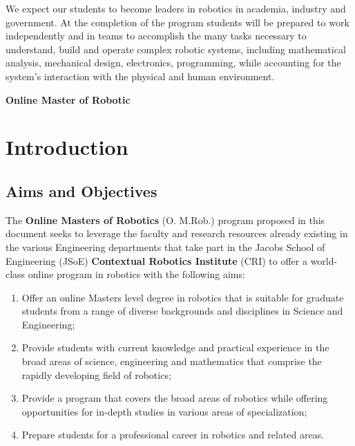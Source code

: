 \documentclass[11pt,letterpaper]{article}
\def\thetitle{Online Master of Robotic}
\begin{document}
We expect our students to become leaders in robotics in
academia, industry and government. At the completion of the program
students will be prepared to work independently and in teams to
accomplish the many tasks necessary to understand, build and operate
complex robotic systems, including mathematical analysis, mechanical
design, electronics, programming, while accounting for the system's
interaction with the physical and human environment.

\newpage

\tableofcontents

\newpage

\begin{center}{\Large\bf {\thetitle}}\end{center}

\section{Introduction}
\label{sec:intro}

\subsection{Aims and Objectives}

The {\bf Online Masters of Robotics} (O. M.Rob.) program proposed in
this document seeks to leverage the faculty and research resources
already existing in the various Engineering departments that take part
in the Jacobs School of Engineering (JSoE) {\bf Contextual Robotics
Institute} (CRI) to offer a world-class online program in robotics
with the following aims:

\begin{enumerate}
\item Offer an online Masters level degree in robotics that is
  suitable for graduate students from a range of diverse backgrounds
  and disciplines in Science and Engineering;

\item Provide students with current knowledge and practical experience
  in the broad areas of science, engineering and mathematics that
  comprise the rapidly developing field of robotics;

\item Provide a program that covers the broad areas of robotics while
  offering opportunities for in-depth studies in various areas of
  specialization;

\item Prepare students for a professional career in robotics and
  related areas.
\end{enumerate}
\end{document}

